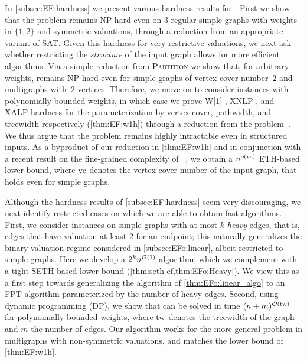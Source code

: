 In \cref{subsec:EF:hardness} we present various hardness results for {\EFo}.
First we show that the problem remains NP-hard even on $3$-regular simple graphs with weights in $\{1,2\}$ and symmetric valuations, through a reduction from an appropriate variant of SAT.
Given this hardness for very restrictive valuations,
we next ask whether restricting the \emph{structure} of the input graph allows for more efficient algorithms.
Via a simple reduction from \textsc{Partition} we show that, for arbitrary weights, %
{\EFo} remains NP-hard even for simple graphs of vertex cover number~$2$ and multigraphs with~$2$ vertices.
Therefore, we move on to consider instances with polynomially-bounded weights, in which case
we prove W[1]-, XNLP-, and XALP-hardness for the parameterization by vertex cover, pathwidth, and treewidth respectively (\cref{thm:EF:w1h}) through a reduction from the {\TOO} problem~\cite{wg/BodlaenderCW22,dam/BodlaenderS26}. We thus argue that the problem remains highly intractable even in structured inputs.
As a byproduct of our reduction in \cref{thm:EF:w1h} and in conjunction with a recent result on the fine-grained complexity of \UBP~\cite{bringmann2026tightsethbasedlowerbounds}, we obtain a $n^{o(\mathrm{vc})}$ ETH-based lower bound,
where $\mathrm{vc}$ denotes the vertex cover number of the input graph, that holds even for simple graphs.

Although the hardness results of \cref{subsec:EF:hardness} seem very discouraging,
we next identify restricted cases on which we are able to obtain fast algorithms.
First, we consider instances on simple graphs with at most $k$ \emph{heavy} edges, that is, edges that have valuation at least $2$ for an endpoint;
this naturally generalizes the binary-valuation regime considered in \cref{subsec:EFo:linear}, albeit restricted to simple graphs.
Here we develop a $2^k n^{\mathcal{O}(1)}$ algorithm, which we complement with a tight SETH-based lower bound (\cref{thm:seth-ef,thm:EFo:Heavy}).
We view this as a first step towards generalizing the algorithm of \cref{thm:EFo:linear_algo} to an FPT algorithm parameterized by the
number of heavy edges. %
Second, using dynamic programming (DP), we show that {\EFo} can be solved in time $(n+m)^{\mathcal{O}(\mathrm{tw})}$ for polynomially-bounded weights,
where $\mathrm{tw}$ denotes the treewidth of the graph and $m$ the number of edges.
Our algorithm works for the more general {\EFmc} problem in multigraphs with non-symmetric valuations,
and matches the lower bound of \cref{thm:EF:w1h}.

